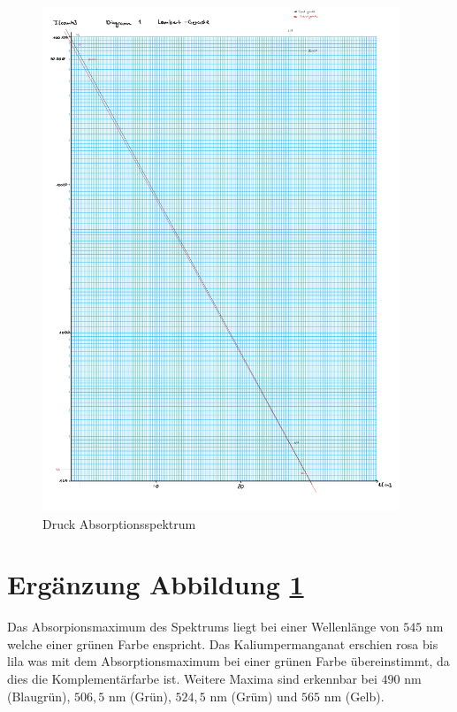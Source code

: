 \begin{figure}[h!]
    \centering
    \includegraphics[page=3, width=0.95\textwidth,]{Versuch34Dias.pdf}
    \caption{Druck Absorptionsspektrum}\label{fig:Absorption}
\end{figure}
\newpage

\setcounter{equation}{6}
\section{Ergänzung Abbildung \ref{fig:Absorption}}

Das Absorpionsmaximum des Spektrums liegt bei einer Wellenlänge von $545$ nm welche
einer grünen Farbe enspricht. Das Kaliumpermanganat erschien rosa bis lila was mit dem
Absorptionsmaximum bei einer grünen Farbe übereinstimmt, da dies die Komplementärfarbe ist.
Weitere Maxima sind erkennbar bei $490$ nm (Blaugrün), $506,5$ nm (Grün), $524,5$ nm (Grüm) und 
$565$ nm (Gelb).

